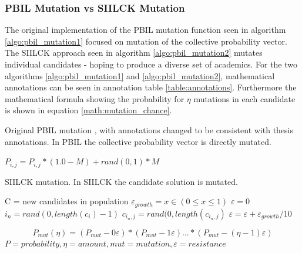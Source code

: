 \documentclass[a4paper,english]{report}
\begin{document}
		\subsubsection{PBIL Mutation vs SIILCK Mutation}
		The original implementation of the PBIL mutation function seen in algorithm \ref{algo:pbil_mutation1} focused on mutation of the collective probability vector. The SIILCK approach seen in algorithm \ref{algo:pbil_mutation2} mutates individual candidates - hoping to produce a diverse set of academics. For the two algorithms \ref{algo:pbil_mutation1} and \ref{algo:pbil_mutation2}, mathematical annotations can be seen in annotation table \ref{table:annotations}. Furthermore the mathematical formula showing the probability for \textit{$\eta$} mutations in each candidate is shown in equation \ref{math:mutation_chance}.
		\begin{algorithm}
			\caption{Original PBIL mutation \cite{pbil}, with annotations changed to be consistent with thesis annotations. In PBIL the collective probability vector is directly mutated.}\label{algo:pbil_mutation1}
			\scriptsize
			\begin{algorithmic}
				
						\STATE $P_{i,j} = P_{i,j} * (1.0 - M) + rand(0,1) * M$
					\ENDIF
				\ENDFOR
			\end{algorithmic}
		\end{algorithm}
		\begin{algorithm}
		\caption{SIILCK mutation. In SIILCK the candidate solution is mutated.}\label{algo:pbil_mutation2}
		\scriptsize
			\begin{algorithmic}
			\REQUIRE C = new candidates in population
			\ENSURE $\varepsilon_{growth} = x \in (0 \leq x \leq 1) $
			\FOR{c in C}
			\IF{$rand(0,1) < P_{mut}$}
				\STATE $\varepsilon = 0$
				\WHILE{$ rand(0,1) < P_{mut} - \varepsilon $}
					\STATE $i_{n} = rand(0, length(c_{i})-1)$
					\STATE $c_{i_{n},j}  = rand(0,length(c_{i_{n},j})$
					\STATE $\varepsilon = \varepsilon + \varepsilon_{growth} / 10$
				\ENDWHILE
			\ENDIF
			\ENDFOR
			
			\end{algorithmic}
		\end{algorithm}
	
			\begin{equation}\label{math:mutation_chance}
			P_{mut}(\eta) = (P_{mut}-0 \varepsilon) * (P_{mut}-1 \varepsilon) \ldots * (P_{mut}-(\eta-1) \varepsilon)
			\end{equation}
			{\centering
				\begin{math}
				P = probability, \eta = amount, mut = mutation, \varepsilon = resistance
				\end{math}\\
			}
		\pagebreak
\end{document}
